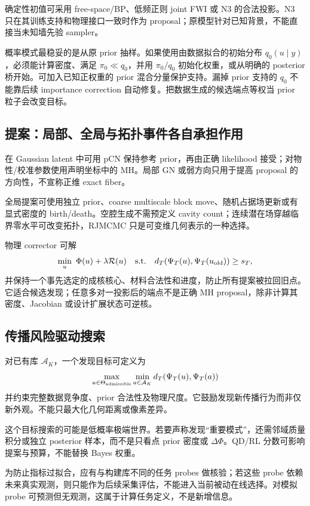 确定性初值可采用 free-space/BP、低频正则 joint FWI 或 N3 的合法投影。N3 只在其训练支持和物理接口一致时作为 proposal；原模型针对已知背景，不能直接当未知墙先验 sampler。\cite{R_A26}

概率模式最稳妥的是从原 prior 抽样。如果使用由数据拟合的初始分布 $q_0(u\mid y)$，必须能计算密度、满足 $\pi_0\ll q_0$，并用 $\pi_0/q_0$ 初始化权重，或从明确的 posterior 桥开始。可加入已知正权重的 prior 混合分量保护支持。漏掉 prior 支持的 $q_0$ 不能靠后续 importance correction 自动修复。把数据生成的候选端点等权当 prior 粒子会改变目标。

\subsection{提案：局部、全局与拓扑事件各自承担作用}
在 Gaussian latent 中可用 pCN 保持参考 prior，再由正确 likelihood 接受；对物性/校准参数使用声明坐标中的 MH。局部 GN 或弱方向只用于提高 proposal 的方向性，不宣称正维 exact fiber。

全局提案可使用独立 prior、coarse multiscale block move、随机占据场更新或有显式密度的 birth/death。空腔生成不需预定义 cavity count；连续潜在场穿越临界零水平可改变拓扑，RJMCMC 只是可变维几何表示的一种选择。

物理 corrector 可解
\[
\min_u\ \Phi(u)+\lambda\mathcal R(u)
\quad\text{s.t.}\quad
d_T(\Psi_T(u),\Psi_T(u_{\rm old}))\ge s_T,
\]
并保持一个事先选定的成核核心、材料合法性和进度，防止所有提案被拉回旧点。它适合候选发现；任意多对一投影后的端点不是正确 MH proposal，除非计算其密度、Jacobian 或设计扩展状态可逆核。

\subsection{传播风险驱动搜索}
对已有库 $\mathcal A_K$，一个发现目标可定义为
\[
\max_{u\in\Theta_{\rm admissible}}
\min_{a\in\mathcal A_K}d_T(\Psi_T(u),\Psi_T(a))
\]
并约束完整数据竞争度、prior 合法性及物理尺度。它鼓励发现新传播行为而非仅新外观。不能只最大化几何距离或像素差异。

这个目标搜索的可能是低概率极端世界。若要声称发现“重要模式”，还需邻域质量积分或独立 posterior 样本，而不是只看点 prior 密度或 $\Delta\Phi$。QD/RL 分数可影响提案与预算，不能替换 Bayes 权重。\cite{R_G,R_F3,R_P2}

为防止指标过拟合，应有与构建库不同的任务 probes 做核验；若这些 probe 依赖未来真实观测，则只能作为后续采集评估，不能进入当前被动在线选择。对模拟 probe 可预测但无观测，这属于计算任务定义，不是新增信息。

